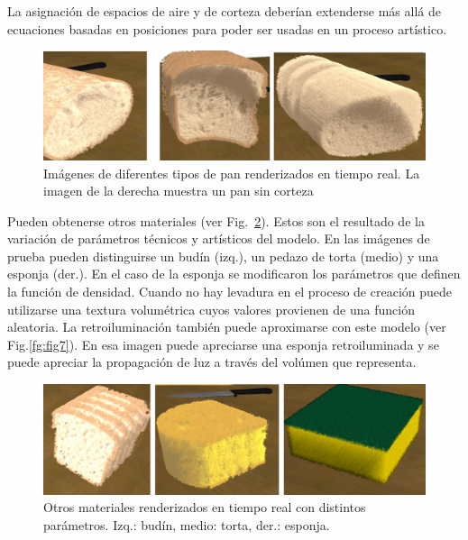 \documentclass[oneside,a4paper,english,links]{amca}
\begin{document}
La asignación de espacios de aire y de corteza deberían extenderse más
allá de ecuaciones basadas en posiciones para poder ser usadas en un
proceso artístico.

\begin{figure}[htb!]
  \centerline{\includegraphics[scale=0.3]{fig5}}
  \caption{Imágenes de diferentes tipos de pan renderizados en tiempo
    real. La imagen de la derecha muestra un pan sin corteza}
  \label{fg:fig5}
\end{figure}

Pueden obtenerse otros materiales (ver Fig.~\ref{fg:fig6}). Estos son
el resultado de la variación de parámetros técnicos y artísticos del
modelo. En las imágenes de prueba pueden distinguirse un budín (izq.), un
pedazo de torta (medio) y una esponja (der.). En el caso de la esponja
se modificaron los parámetros que definen la función de
densidad. Cuando no hay levadura en el proceso de creación puede
utilizarse una textura volumétrica cuyos valores provienen de una
función aleatoria. La retroiluminación también puede aproximarse con
este modelo (ver Fig.\ref{fg:fig7}). En esa imagen puede apreciarse
una esponja retroiluminada y se puede apreciar la propagación de luz a
través del volúmen que representa.

\begin{figure}[htb!]
  \centerline{\includegraphics[scale=0.3]{fig6}}
  \caption{Otros materiales renderizados en tiempo real con distintos parámetros. Izq.: budín, medio: torta, der.: esponja. }
  \label{fg:fig6}
\end{figure}
\end{document}
